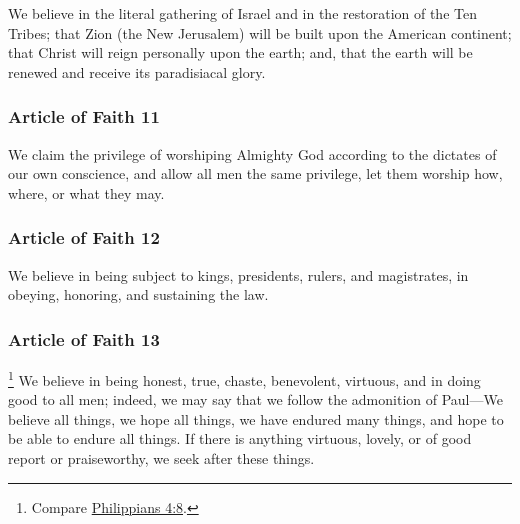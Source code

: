		We believe in the literal gathering of Israel and in the restoration of the Ten Tribes; that Zion (the New Jerusalem) will be built upon the American continent; that Christ will reign personally upon the earth; and, that the earth will be renewed and receive its paradisiacal glory.
		
	\subsubsection{Article of Faith 11}
		\label{ARTICLESOFFAITH-11}
		
		We claim the privilege of worshiping Almighty God according to the dictates of our own conscience, and allow all men the same privilege, let them worship how, where, or what they may.
		
	\subsubsection{Article of Faith 12}
		\label{ARTICLESOFFAITH-12}
		
		We believe in being subject to kings, presidents, rulers, and magistrates, in obeying, honoring, and sustaining the law.
		
	\subsubsection{Article of Faith 13}
		\label{ARTICLESOFFAITH-13}
		
			\footnote{%
				Compare \hyperref[PHILIPPIANS-4-8]{Philippians 4:8}.
				}%
		We believe in being honest, true, chaste, benevolent, virtuous, and in doing good to all men; indeed, we may say that we follow the admonition of Paul---We believe all things, we hope all things, we have endured many things, and hope to be able to endure all things.  If there is anything virtuous, lovely, or of good report or praiseworthy, we seek after these things.